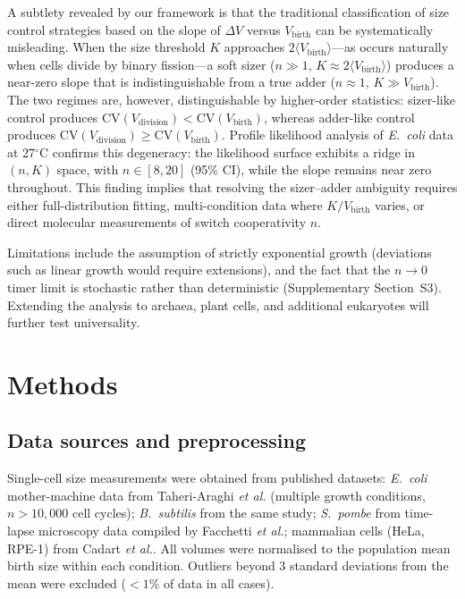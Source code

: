 \documentclass[11pt]{article}
\newcommand{\Vbirth}{V_{\text{birth}}}
\newcommand{\Vdiv}{V_{\text{division}}}
\newcommand{\DeltaV}{\Delta V}
\newcommand{\Ecoli}{\textit{E.~coli}}
\newcommand{\Spombe}{\textit{S.~pombe}}
\newcommand{\Bsubtilis}{\textit{B.~subtilis}}
\begin{document}
A subtlety revealed by our framework is that the traditional
classification of size control strategies based on the slope of
$\DeltaV$ versus $\Vbirth$ can be systematically misleading.
When the size threshold $K$ approaches
$2\langle\Vbirth\rangle$---as occurs naturally when cells divide
by binary fission---a soft sizer ($n \gg 1$,
$K \approx 2\langle\Vbirth\rangle$) produces a near-zero slope
that is indistinguishable from a true adder
($n \approx 1$, $K \gg \Vbirth$).  The two regimes are, however,
distinguishable by higher-order statistics: sizer-like control
produces $\mathrm{CV}(\Vdiv) < \mathrm{CV}(\Vbirth)$, whereas
adder-like control produces
$\mathrm{CV}(\Vdiv) \geq \mathrm{CV}(\Vbirth)$.
Profile likelihood analysis of \Ecoli{} data at 27$^\circ$C
confirms this degeneracy: the likelihood surface exhibits a ridge
in $(n, K)$ space, with $n \in [8, 20]$ (95\% CI), while the
slope remains near zero throughout.  This finding implies that
resolving the sizer--adder ambiguity requires either
full-distribution fitting, multi-condition data where
$K/\Vbirth$ varies, or direct molecular measurements of switch
cooperativity $n$.

Limitations include the assumption of strictly exponential growth
(deviations such as linear growth\cite{harris2016} would require
extensions), and the fact that the $n \to 0$ timer limit is
stochastic rather than deterministic (Supplementary Section~S3).
Extending the analysis to archaea\cite{eun2018}, plant cells,
and additional eukaryotes will further test universality.

\section*{Methods}

\subsection*{Data sources and preprocessing}

Single-cell size measurements were obtained from published datasets:
\Ecoli{} mother-machine data from Taheri-Araghi
\textit{et al.}\cite{taheri2015} (multiple growth conditions,
$n > 10{,}000$ cell cycles); \Bsubtilis{} from the same
study; \Spombe{} from time-lapse microscopy data compiled
by Facchetti \textit{et al.}\cite{facchetti2019}; mammalian cells (HeLa,
RPE-1) from Cadart \textit{et al.}\cite{cadart2018}.
All volumes were normalised to the population mean birth
size within each condition.  Outliers beyond 3 standard deviations
from the mean were excluded ($<1\%$ of data in all cases).
\end{document}
